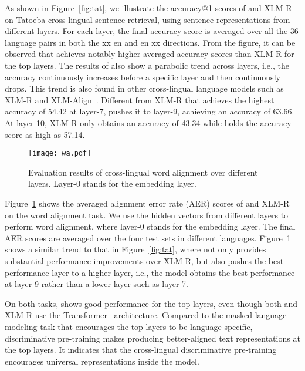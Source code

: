 \documentclass[11pt]{article}
\newcommand\our{\makebox{\textsc{XLM-E}}}
\begin{document}
As shown in Figure~\ref{fig:tat}, we illustrate the accuracy@1 scores of \our{} and XLM-R on Tatoeba cross-lingual sentence retrieval, using sentence representations from different layers. For each layer, the final accuracy score is averaged over all the 36 language pairs in both the xx  en and en  xx directions. 
From the figure, it can be observed that \our{} achieves notably higher averaged accuracy scores than XLM-R for the top layers. The results of \our{} also show a parabolic trend across layers, i.e., the accuracy continuously increases before a specific layer and then continuously drops.
This trend is also found in other cross-lingual language models such as XLM-R and XLM-Align~\cite{simalign,xlmalign}. Different from XLM-R that achieves the highest accuracy of 54.42 at layer-7, \our{} pushes it to layer-9, achieving an accuracy of 63.66. At layer-10, XLM-R only obtains an accuracy of 43.34 while \our{} holds the accuracy score as high as 57.14.


\begin{figure}
\centering
\texttt{[image: wa.pdf]}
\caption{Evaluation results of cross-lingual word alignment over different layers. Layer-0 stands for the embedding layer.}
\label{fig:wa}
\end{figure}


Figure~\ref{fig:wa} shows the averaged alignment error rate (AER) scores of \our{} and XLM-R on the word alignment task. We use the hidden vectors from different layers to perform word alignment, where layer-0 stands for the embedding layer. The final AER scores are averaged over the four test sets in different languages. Figure~\ref{fig:wa} shows a similar trend to that in Figure~\ref{fig:tat}, where \our{} not only provides substantial performance improvements over XLM-R, but also pushes the best-performance layer to a higher layer, i.e., the model obtains the best performance at layer-9 rather than a lower layer such as layer-7. 

On both tasks, \our{} shows good performance for the top layers, even though both \our{} and XLM-R use the Transformer~\cite{transformer} architecture. 
Compared to the masked language modeling task that encourages the top layers to be language-specific, discriminative pre-training makes \our{} producing better-aligned text representations at the top layers.
It indicates that the cross-lingual discriminative pre-training encourages universal representations inside the model.
\end{document}
